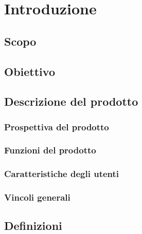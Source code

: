 \section{Introduzione}

\subsection{Scopo}

\subsection{Obiettivo}

\subsection{Descrizione del prodotto}

\subsubsection{Prospettiva del prodotto}

\subsubsection{Funzioni del prodotto}

\subsubsection{Caratteristiche degli utenti}

\subsubsection{Vincoli generali}

\subsection{Definizioni}
